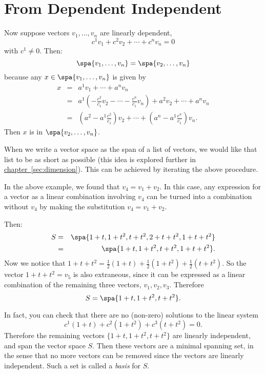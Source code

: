 \section{From Dependent Independent } 
Now suppose vectors 
$v_1,\ldots, v_n$ are linearly dependent, 
\[
c^1v_1 + c^2v_2+ \cdots +c^nv_n=0
\]
with $c^1\neq 0$.  Then:
\[
\spa \{v_1,\ldots, v_n\} = \spa \{ v_2,\ldots, v_n\}
\]
because any $x\in \spa \{v_1,\ldots, v_n\}$ is given by
\begin{eqnarray*}
x &=& a^1v_1 + \cdots+ a^nv_n \\
&=& a^1\left( -\frac{c^2}{c_1}v_2- \cdots -\frac{c^n}{c_1}v_n \right) + a^2v_2 + \cdots + a^nv_n \\
&=& \left(a^2-a^1\frac{c^2}{c_1}\right)v_2 + \cdots + \left(a^n-a^1\frac{c^n}{c_1}\right)v_n.
\end{eqnarray*}
Then $x$ is in $\spa \{v_2,\ldots, v_n\}$.

When we write a vector space as the span of a list of vectors, we would like that list to be as short as possible (this idea is explored further in \hyperref[dimension]{chapter~\ref*{sec:dimension}}).
This can be achieved by iterating the above procedure.

\begin{example}
In the above example, we found that $v_4=v_1+v_2$.  In this case, any expression for a vector as a linear combination involving $v_4$ can be turned into a combination without $v_4$ by making the substitution $v_4=v_1+v_2$.

Then:
\begin{eqnarray*}
S &=& \spa \{ 1+t , 1+t^2, t+t^2, 2+t+t^2, 1+t+t^2 \} \\
&=& \spa \{ 1+t , 1+t^2, t+t^2, 1+t+t^2 \}.
\end{eqnarray*}
Now we notice that $1+t+t^2=\frac{1}{2}(1+t) +\frac{1}{2}(1+t^2) + \frac{1}{2}(t+t^2)$.  So the vector $1+t+t^2=v_5$ is also extraneous, since it can be expressed as a linear combination of the remaining three vectors, $v_1, v_2,v_3$.  Therefore 
\[
S = \spa \{ 1+t , 1+t^2, t+t^2 \}.
\]

In fact, you can check that there are no (non-zero) solutions to the linear system
\[
c^1(1+t) + c^2(1+t^2) + c^3(t+t^2)=0.
\]
Therefore the remaining vectors $\{ 1+t , 1+t^2, t+t^2 \}$ are linearly independent, and span the vector space $S$.  Then these vectors are a minimal spanning set, in the sense that no more vectors can be removed since the vectors are linearly independent.
Such a set is called a \emph{basis} for $S$.
\end{example}





